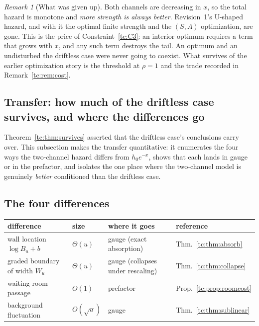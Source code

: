 \documentclass[11pt]{article}
\numberwithin{equation}{section}
\theoremstyle{plain}
\theoremstyle{definition}
\theoremstyle{remark}
\newtheorem{remark}[theorem]{Remark}
\begin{document}
\begin{remark}[What was given up]\label{tc:rem:givenup}
Both channels are decreasing in $x$, so the total hazard is monotone and
\emph{more strength is always better}. Revision~1's U-shaped hazard, and
with it the optimal finite strength and the $(S,A)$ optimization, are
gone. This is the price of Constraint~\ref{tc:C3}: an interior optimum
requires a term that grows with $x$, and any such term destroys the
tail. An optimum and an undisturbed the driftless case were never going to
coexist. What survives of the earlier optimization story is the
threshold at $\rho=1$ and the trade recorded in
Remark~\ref{tc:rem:cost}.
\end{remark}

\subsection{Transfer: how much of the driftless case survives, and where the
differences go}\label{tc:sub:transfer}

Theorem~\ref{tc:thm:survives} asserted that the driftless case's conclusions
carry over. This subsection makes the transfer quantitative: it
enumerates the four ways the two-channel hazard differs from
$h_{0}e^{-x}$, shows that each lands in gauge or in the prefactor, and
isolates the one place where the two-channel model is genuinely
\emph{better} conditioned than the driftless case.

\subsection{The four differences}\label{tc:subsub:four}

\begin{center}\small
\begin{tabular}{@{}llll@{}}
\toprule
difference & size & where it goes & reference\\
\midrule
wall location $\log B_u+b$ & $\Theta(u)$ & gauge (exact absorption) &
Thm.~\ref{tc:thm:absorb}\\
graded boundary of width $W_u$ & $\Theta(u)$ & gauge (collapses under
rescaling) & Thm.~\ref{tc:thm:collapse}\\
waiting-room passage & $O(1)$ & prefactor & Prop.~\ref{tc:prop:roomcost}\\
background fluctuation & $O(\sqrt u)$ & gauge &
Thm.~\ref{tc:thm:sublinear}\\
\bottomrule
\end{tabular}
\end{center}
\end{document}
